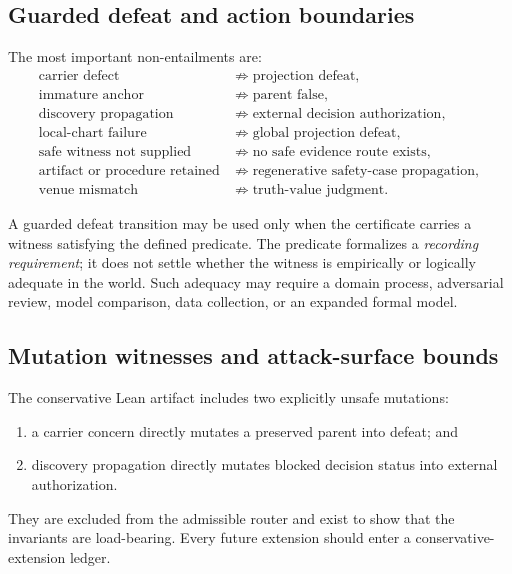 \documentclass[10pt]{article}
\begin{document}
\subsection{Guarded defeat and action boundaries}

The most important non-entailments are:
\begin{align}
\text{carrier defect} &\not\Rightarrow \text{projection defeat},\\
\text{immature anchor} &\not\Rightarrow \text{parent false},\\
\text{discovery propagation} &\not\Rightarrow \text{external decision authorization},\\
\text{local-chart failure} &\not\Rightarrow \text{global projection defeat},\\
\text{safe witness not supplied} &\not\Rightarrow \text{no safe evidence route exists},\\
\text{artifact or procedure retained} &\not\Rightarrow \text{regenerative safety-case propagation},\\
\text{venue mismatch} &\not\Rightarrow \text{truth-value judgment}.
\end{align}

A guarded defeat transition may be used only when the certificate carries a witness satisfying the defined predicate. The predicate formalizes a \emph{recording requirement}; it does not settle whether the witness is empirically or logically adequate in the world. Such adequacy may require a domain process, adversarial review, model comparison, data collection, or an expanded formal model.

\subsection{Mutation witnesses and attack-surface bounds}

The conservative Lean artifact includes two explicitly unsafe mutations:
\begin{enumerate}[label=(\arabic*)]
\item a carrier concern directly mutates a preserved parent into defeat; and
\item discovery propagation directly mutates blocked decision status into external authorization.
\end{enumerate}

They are excluded from the admissible router and exist to show that the invariants are load-bearing. Every future extension should enter a conservative-extension ledger.
\end{document}
